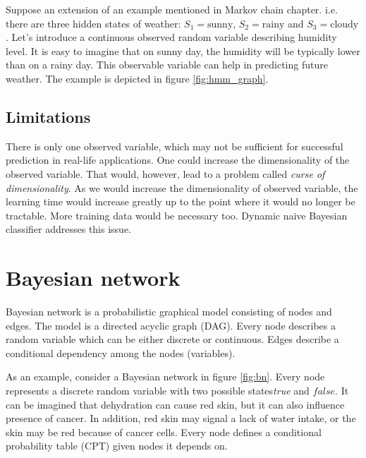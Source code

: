 \documentclass[thesis=B,english]{FITthesis}[2012/06/26]
\begin{document}
Suppose an extension of an example mentioned in Markov chain chapter. i.e. there are three hidden states of weather: $S_1 = \text{sunny}$, $S_2 = \text{rainy}$ and $S_3 = \text{cloudy}$. Let's introduce a continuous observed random variable describing humidity level. It is easy to imagine that on sunny day, the humidity will be typically lower than on a rainy day. This observable variable can help in predicting future weather. The example is depicted in figure \ref{fig:hmm_graph}.

\subsection{Limitations}
There is only one observed variable, which may not be sufficient for successful prediction in real-life applications. One could increase the dimensionality of the observed variable. That would, however, lead to a problem called \textit{curse of dimensionality}. As we would increase the dimensionality of observed variable, the learning time would increase greatly up to the point where it would no longer be tractable. More training data would be necessary too. Dynamic naive Bayesian classifier addresses this issue.

\section{Bayesian network}

Bayesian network is a probabilistic graphical model consisting of nodes and edges. The model is a directed acyclic graph (DAG). Every node describes a random variable which can be either discrete or continuous. Edges describe a conditional dependency among the nodes (variables).

As an example, consider a Bayesian network in figure \ref{fig:bn}. Every node represents a discrete random variable with two possible states\textemdash\textit{true} and $false$. It can be imagined that dehydration can cause red skin, but it can also influence presence of cancer. In addition, red skin may signal a lack of water intake, or the skin may be red because of cancer cells. Every node defines a conditional probability table (CPT) given nodes it depends on.
\end{document}
